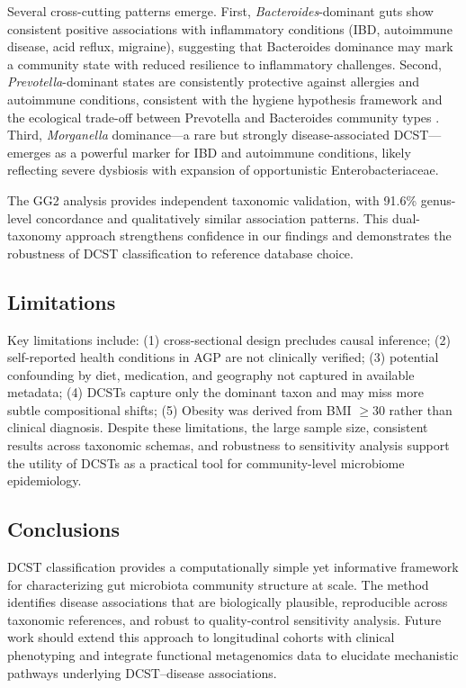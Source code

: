 \documentclass[11pt,a4paper]{article}
\begin{document}
Several cross-cutting patterns emerge. First, \textit{Bacteroides}-dominant guts show consistent positive associations with inflammatory conditions (IBD, autoimmune disease, acid reflux, migraine), suggesting that Bacteroides dominance may mark a community state with reduced resilience to inflammatory challenges. Second, \textit{Prevotella}-dominant states are consistently protective against allergies and autoimmune conditions, consistent with the hygiene hypothesis framework and the ecological trade-off between Prevotella and Bacteroides community types \cite{Arumugam2011_enterotypes}. Third, \textit{Morganella} dominance---a rare but strongly disease-associated DCST---emerges as a powerful marker for IBD and autoimmune conditions, likely reflecting severe dysbiosis with expansion of opportunistic Enterobacteriaceae.

The GG2 analysis provides independent taxonomic validation, with 91.6\% genus-level concordance and qualitatively similar association patterns. This dual-taxonomy approach strengthens confidence in our findings and demonstrates the robustness of DCST classification to reference database choice.

\subsection{Limitations}
Key limitations include: (1) cross-sectional design precludes causal inference; (2) self-reported health conditions in AGP are not clinically verified; (3) potential confounding by diet, medication, and geography not captured in available metadata; (4) DCSTs capture only the dominant taxon and may miss more subtle compositional shifts; (5) Obesity was derived from BMI $\geq 30$ rather than clinical diagnosis. Despite these limitations, the large sample size, consistent results across taxonomic schemas, and robustness to sensitivity analysis support the utility of DCSTs as a practical tool for community-level microbiome epidemiology.

\subsection{Conclusions}
DCST classification provides a computationally simple yet informative framework for characterizing gut microbiota community structure at scale. The method identifies disease associations that are biologically plausible, reproducible across taxonomic references, and robust to quality-control sensitivity analysis. Future work should extend this approach to longitudinal cohorts with clinical phenotyping and integrate functional metagenomics data to elucidate mechanistic pathways underlying DCST--disease associations.



\end{document}
